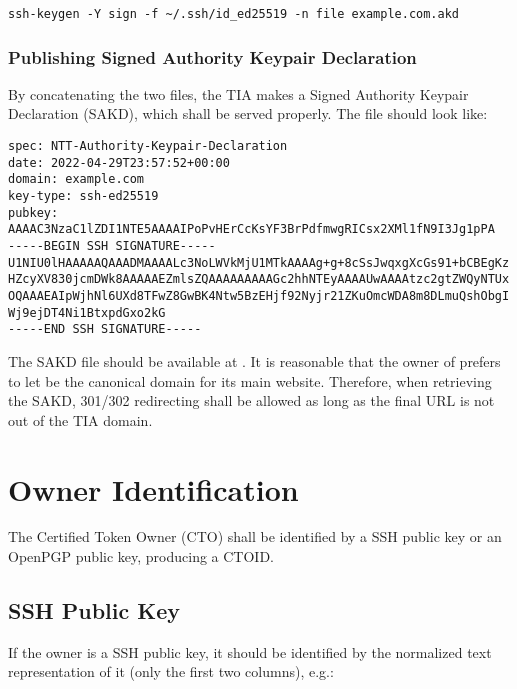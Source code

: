 \begin{lstlisting}
ssh-keygen -Y sign -f ~/.ssh/id_ed25519 -n file example.com.akd
\end{lstlisting}

\subsubsection{Publishing Signed Authority Keypair Declaration}

By concatenating the two files, the TIA makes a Signed Authority Keypair Declaration (SAKD), which shall be served properly.
The file should look like:

\begin{lstlisting}
spec: NTT-Authority-Keypair-Declaration
date: 2022-04-29T23:57:52+00:00
domain: example.com
key-type: ssh-ed25519
pubkey: AAAAC3NzaC1lZDI1NTE5AAAAIPoPvHErCcKsYF3BrPdfmwgRICsx2XMl1fN9I3Jg1pPA
-----BEGIN SSH SIGNATURE-----
U1NIU0lHAAAAAQAAADMAAAALc3NoLWVkMjU1MTkAAAAg+g+8cSsJwqxgXcGs91+bCBEgKz
HZcyXV830jcmDWk8AAAAAEZmlsZQAAAAAAAAAGc2hhNTEyAAAAUwAAAAtzc2gtZWQyNTUx
OQAAAEAIpWjhNl6UXd8TFwZ8GwBK4Ntw5BzEHjf92Nyjr21ZKuOmcWDA8m8DLmuQshObgI
Wj9ejDT4Ni1BtxpdGxo2kG
-----END SSH SIGNATURE-----
\end{lstlisting}

The SAKD file should be available at .
It is reasonable that the owner of  prefers to let  be the canonical domain for its main website.
Therefore, when retrieving the SAKD, 301/302 redirecting shall be allowed as long as the final  URL is not out of the TIA domain.












\section{Owner Identification}

The Certified Token Owner (CTO) shall be identified by a SSH public key or an OpenPGP public key, producing a CTOID.


\subsection{SSH Public Key}

If the owner is a SSH public key, it should be identified by the normalized text representation of it (only the first two columns), e.g.:

